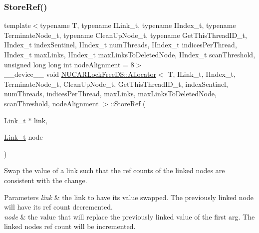 \subsubsection{\texorpdfstring{Store\+Ref()}{StoreRef()}}
{\footnotesize\ttfamily template$<$typename T, typename I\+Link\+\_\+t, typename I\+Index\+\_\+t, typename Terminate\+Node\+\_\+t, typename Clean\+Up\+Node\+\_\+t, typename Get\+This\+Thread\+I\+D\+\_\+t, I\+Index\+\_\+t index\+Sentinel, I\+Index\+\_\+t num\+Threads, I\+Index\+\_\+t indices\+Per\+Thread, I\+Index\+\_\+t max\+Links, I\+Index\+\_\+t max\+Links\+To\+Deleted\+Node, I\+Index\+\_\+t scan\+Threshold, unsigned long long int node\+Alignment = 8$>$ \\
\+\_\+\+\_\+device\+\_\+\+\_\+ void \mbox{\hyperlink{class_n_u_c_a_r_lock_free_d_s_1_1_allocator}{N\+U\+C\+A\+R\+Lock\+Free\+D\+S\+::\+Allocator}}$<$ T, I\+Link\+\_\+t, I\+Index\+\_\+t, Terminate\+Node\+\_\+t, Clean\+Up\+Node\+\_\+t, Get\+This\+Thread\+I\+D\+\_\+t, index\+Sentinel, num\+Threads, indices\+Per\+Thread, max\+Links, max\+Links\+To\+Deleted\+Node, scan\+Threshold, node\+Alignment $>$\+::Store\+Ref (\begin{DoxyParamCaption}\item[{\mbox{\hyperlink{class_n_u_c_a_r_lock_free_d_s_1_1_allocator_a5508d82b795e6c1977bebb67b5e5b686}{Link\+\_\+t}} $\ast$}]{link,  }\item[{\mbox{\hyperlink{class_n_u_c_a_r_lock_free_d_s_1_1_allocator_a5508d82b795e6c1977bebb67b5e5b686}{Link\+\_\+t}}}]{node }\end{DoxyParamCaption})\hspace{0.3cm}{\ttfamily [inline]}}

Swap the value of a link such that the ref counts of the linked nodes are consistent with the change. 
\begin{DoxyParams}{Parameters}
{\em link} & the link to have its value swapped. The previously linked node will have its ref count decremented. \\
\hline
{\em node} & the value that will replace the previously linked value of the first arg. The linked node\textquotesingle{}s ref count will be incremented. \\
\hline
\end{DoxyParams}
\mbox{\label{class_n_u_c_a_r_lock_free_d_s_1_1_allocator_a8bd90fb5b60a5e8099775c1725a0613d}} 
